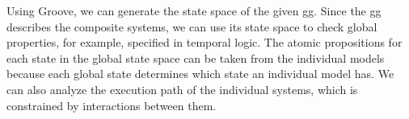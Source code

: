 \documentclass[a4paper]{easychair}
\begin{document}
Using Groove, we can generate the state space of the given \gls*{gg}.
Since the \gls*{gg} describes the composite systems, we can use its state space to check global properties, for example, specified in temporal logic.
The atomic propositions for each state in the global state space can be taken from the individual models because each global state determines which state an individual model has.
We can also analyze the execution path of the individual systems, which is constrained by interactions between them.


%
%
%



\end{document}
